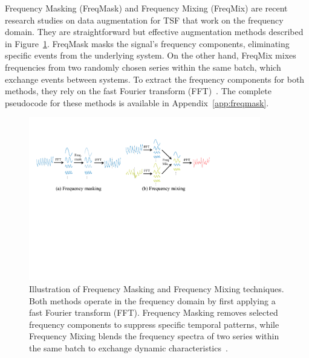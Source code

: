 Frequency Masking (FreqMask) and Frequency Mixing (FreqMix) are recent research studies on data augmentation for TSF that work on the frequency domain. They are straightforward but effective augmentation methods described in Figure~\ref{fig:freqmask}. FreqMask masks the signal's frequency components, eliminating specific events from the underlying system. On the other hand, FreqMix mixes frequencies from two randomly chosen series within the same batch, which exchange events between systems. To extract the frequency components for both methods, they rely on the fast Fourier transform (FFT)~\cite{chen2023fraugfrequencydomainaugmentation}. The complete pseudocode for these methods is available in Appendix~\ref{app:freqmask}.



\begin{figure}[h!]
    \centering
    \includegraphics[page=1, width=0.9\textwidth]{./images/freqmaskmix.pdf}
\caption{Illustration of Frequency Masking and Frequency Mixing techniques. Both methods operate in the frequency domain by first applying a fast Fourier transform (FFT). Frequency Masking removes selected frequency components to suppress specific temporal patterns, while Frequency Mixing blends the frequency spectra of two series within the same batch to exchange dynamic characteristics~\cite{chen2023fraugfrequencydomainaugmentation}.}

    \label{fig:freqmask}
\end{figure}





